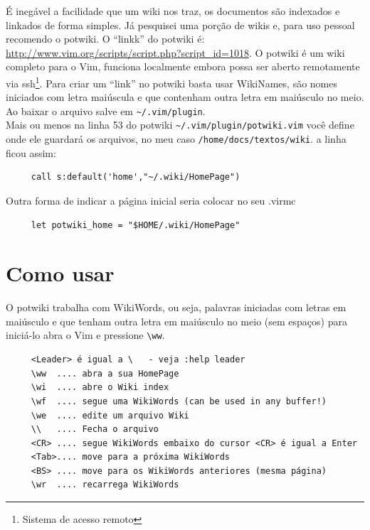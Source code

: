 \documentclass[10pt,a4paper,openany]{book}
\begin{document}
É inegável a facilidade que um wiki nos traz, os documentos são
indexados e linkados de forma simples. Já pesquisei uma porção de
wikis e, para uso pessoal recomendo o potwiki.  O ``linkk'' do potwiki é:
\url{http://www.vim.org/scripts/script.php?script_id=1018}.
O potwiki é um wiki completo para o Vim, funciona localmente embora
possa ser aberto remotamente via ssh\footnote{Sistema de acesso remoto}.
Para criar um ``link'' no potwiki basta usar WikiNames, são nomes
iniciados com letra maiúscula e que contenham outra letra em maiúsculo
no meio. \\


Ao baixar o arquivo salve em \verb|~/.vim/plugin|. \\



Mais ou menos na linha 53 do potwiki \verb|~/.vim/plugin/potwiki.vim| você
define onde ele guardará os arquivos, no meu caso
\verb|/home/docs/textos/wiki|. a linha ficou assim:

\begin{verbatim}
     call s:default('home',"~/.wiki/HomePage")
\end{verbatim}

Outra forma de indicar a página inicial seria colocar no seu .virmc

\begin{verbatim}
     let potwiki_home = "$HOME/.wiki/HomePage"
\end{verbatim}

\section{Como usar}
\label{Como usar}

O potwiki trabalha com WikiWords, ou seja, palavras iniciadas com
letras em maiúsculo e que tenham outra letra em maiúsculo no meio (sem
espaços) para iniciá-lo abra o Vim e pressione \verb|\ww|.

\begin{verbatim}
     <Leader> é igual a \   - veja :help leader
     \ww  .... abra a sua HomePage
     \wi  .... abre o Wiki index
     \wf  .... segue uma WikiWords (can be used in any buffer!)
     \we  .... edite um arquivo Wiki
     \\   .... Fecha o arquivo
     <CR> .... segue WikiWords embaixo do cursor <CR> é igual a Enter
     <Tab>.... move para a próxima WikiWords
     <BS> .... move para os WikiWords anteriores (mesma página)
     \wr  .... recarrega WikiWords
\end{verbatim}
\end{document}
